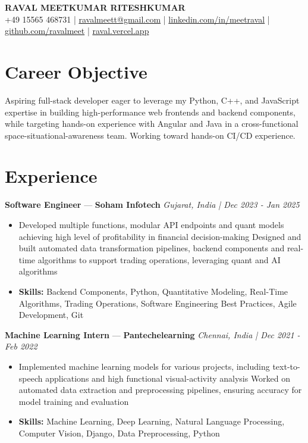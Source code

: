\documentclass[a4paper,10pt]{article}
\begin{document}
\begin{center}
  {\Large\bfseries RAVAL MEETKUMAR RITESHKUMAR}\\[2pt]
  {\small +49 15565 468731 \;|\; \href{mailto:ravalmeett@gmail.com}{ravalmeett@gmail.com} \;|\; \href{https://www.linkedin.com/in/meetraval/}{linkedin.com/in/meetraval} \;|\; \href{https://github.com/ravalmeet}{github.com/ravalmeet} \;|\; \href{https://raval.vercel.app/}{raval.vercel.app}}
\end{center}
\vspace{-3pt}

\section*{Career Objective}
Aspiring full-stack developer eager to leverage my Python, C++, and JavaScript expertise in building high-performance web frontends and backend components, while targeting hands-on experience with Angular and Java in a cross-functional space-situational-awareness team. Working toward hands-on CI/CD experience.\par

\section*{Experience}
\textbf{Software Engineer} — \textbf{Soham Infotech} \hfill \textit{Gujarat, India \;|\; Dec 2023 - Jan 2025}\par
\vspace{1pt}
\begin{itemize}
  \item Developed multiple functions, modular API endpoints and quant models achieving high level of profitability in financial decision-making Designed and built automated data transformation pipelines, backend components and real-time algorithms to support trading operations, leveraging quant and AI algorithms
  \item \textbf{Skills:} Backend Components, Python, Quantitative Modeling, Real-Time Algorithms, Trading Operations, Software Engineering Best Practices, Agile Development, Git
\end{itemize}
\vspace{3pt}
\textbf{Machine Learning Intern} — \textbf{Pantechelearning} \hfill \textit{Chennai, India \;|\; Dec 2021 - Feb 2022}\par
\vspace{1pt}
\begin{itemize}
  \item Implemented machine learning models for various projects, including text-to-speech applications and high functional visual-activity analysis Worked on automated data extraction and preprocessing pipelines, ensuring accuracy for model training and evaluation
  \item \textbf{Skills:} Machine Learning, Deep Learning, Natural Language Processing, Computer Vision, Django, Data Preprocessing, Python
\end{itemize}
\end{document}
